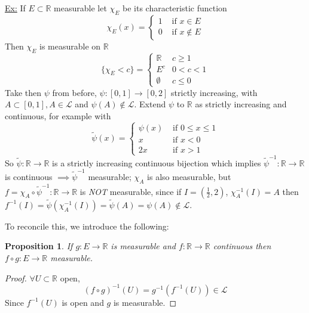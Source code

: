 \documentclass[11pt]{article}
\newtheorem*{prop}{Proposition}
\newcommand{\R}{\mathbb{R}}
\newcommand{\Le}{\mathcal{L}}
\begin{document}
    \underline{Ex:} If $E \subset \R$ measurable let $\chi_{E}$ be its characteristic function
    \[
        \chi_E (x) = \begin{cases}
                         1 & \text{ if } x \in E \\
                         0 & \text{ if } x \notin E
        \end{cases}
    \]
    Then $\chi_E$ is measurable on $\R$
    \[
        \{ \chi_E < c \} = \begin{cases}
                               \R & c \geq 1 \\
                               E^c & 0 < c < 1 \\
                               \emptyset & c \leq 0
        \end{cases}
    \]
    Take then $\psi$ from before, $\psi: [0,1] \rightarrow [0,2]$ strictly increasing, with $A \subset [0,1], A \in \mathcal{L}$ and $\psi(A) \notin \Le$.
    Extend $\psi$ to $\R$ as strictly increasing and continuous, for example with
    \[
        \tilde{\psi} (x) = \begin{cases}
                               \psi(x) & \text{ if } 0 \leq x \leq 1\\
                               x & \text{ if } x < 0 \\
                               2x & \text{ if } x > 1
        \end{cases}
    \]
    So $\tilde{\psi}: \R \rightarrow \R$ is a strictly increasing continuous bijection which implies $\tilde{\psi}^{-1}: \R \rightarrow \R$ is continuous $\implies \tilde{\psi}^{-1}$ measurable;
    $\chi_A$ is also measurable, but $f = \chi_{A} \circ \tilde{\psi}^{-1} : \R \rightarrow \R$ is \emph{NOT} measurable, since if $I = \left( \frac{1}{2}, 2 \right)$, $\chi_{A}^{-1} (I) = A$ then $f^{-1}(I) = \tilde{\psi} \left( \chi_A ^{-1} (I) \right) = \tilde{\psi} (A) = \psi(A) \notin \Le$.

    To reconcile this, we introduce the following:
    \begin{prop}
        If $g: E \rightarrow \R$ is measurable and $f: \R \rightarrow \R$ continuous then $f \circ g: E \rightarrow \R$ measurable.
    \end{prop}

    \begin{proof}
        $\forall U \subset \R $ open,
        \[
            (f \circ g)^{-1}(U) = g^{-1}(f^{-1}(U)) \in \Le
        \]
        Since $f^{-1}(U)$ is open and $g$ is measurable.
    \end{proof}
\end{document}
